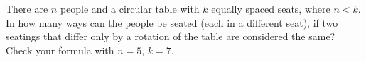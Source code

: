 There are $n$ people and a circular table with $k$ equally spaced seats, where $n<k$. In how many ways can the people be seated (each in a different seat), if two seatings that differ only by a rotation of the table are considered the same? Check your formula with $n=5$, $k=7$.
